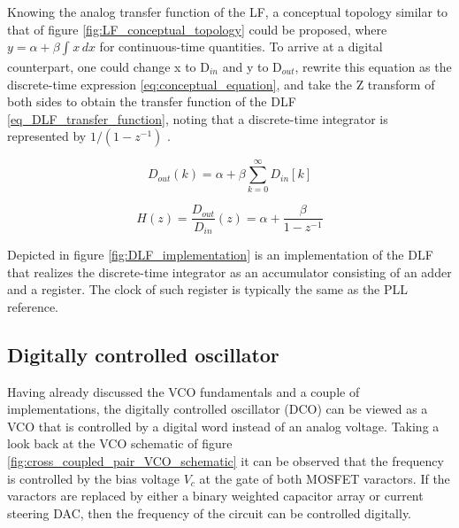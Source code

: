 Knowing the analog transfer function of the LF, a conceptual topology similar to that of figure \ref{fig:LF_conceptual_topology} could be proposed, where $y = \alpha + \beta \int_{}^{} x \,dx$
for continuous-time quantities. To arrive at a digital counterpart, one could change x to D$_{in}$ and y to D$_{out}$, rewrite this equation as the discrete-time expression
\eqref{eq:conceptual_equation}, and take the Z transform of both sides to obtain the transfer function of the DLF \eqref{eq_DLF_transfer_function}, noting that a discrete-time integrator
is represented by $1/(1 - z^{-1})$ \cite{Razavi_PLL_book}.

\begin{equation}
    D_{out}(k) = \alpha + \beta \sum_{k=0}^{\infty} D_{in}[k]
    \label{eq:conceptual_equation}
\end{equation}

\begin{equation}
    H(z) = \frac{D_{out}}{D_{in}}(z) = \alpha + \frac{\beta}{1 - z^{-1}}
    \label{eq_DLF_transfer_function}
\end{equation}

Depicted in figure \ref{fig:DLF_implementation} is an implementation of the DLF that realizes the discrete-time integrator as an accumulator consisting of an adder and a register. The
clock of such register is typically the same as the PLL reference.

\subsection{Digitally controlled oscillator}

Having already discussed the VCO fundamentals and a couple of implementations, the digitally controlled oscillator (DCO) can be viewed as a VCO that is controlled by a digital word instead
of an analog voltage. Taking a look back at the VCO schematic of figure \ref{fig:cross_coupled_pair_VCO_schematic} it can be observed that the frequency is controlled by the bias
voltage $V_c$ at the gate of both MOSFET varactors. If the varactors are replaced by either a binary weighted capacitor array or current steering DAC, then the frequency of the circuit can
be controlled digitally.

